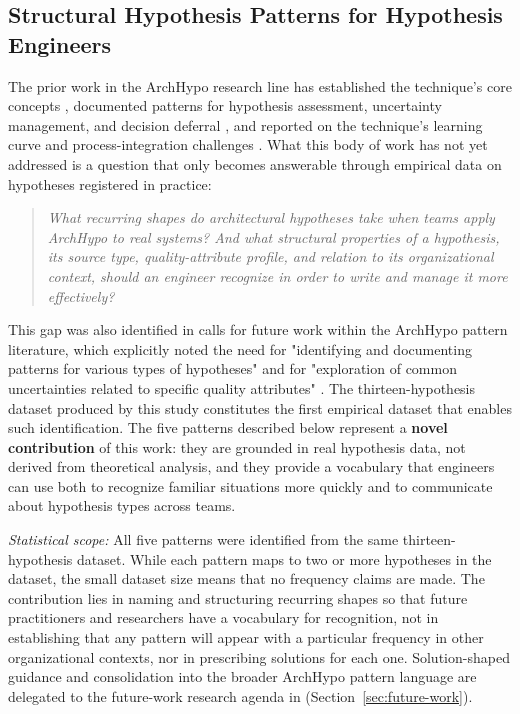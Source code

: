 \subsection{Structural Hypothesis Patterns for Hypothesis Engineers}
\label{sec:group-b-patterns}

The prior work in the ArchHypo research line has established the technique's
core concepts \citep{silva2025archhypo}, documented patterns for hypothesis
assessment, uncertainty management, and decision deferral
\citep{silva2024patterns, silva2023initialpatterns}, and reported on the
technique's learning curve and process-integration challenges
\citep{silva2024archhypo}. What this body of work has not yet addressed is
a question that only becomes answerable through empirical data on
hypotheses registered in practice:

\begin{quote}
\textit{What recurring shapes do architectural hypotheses take when teams apply
ArchHypo to real systems? And what structural properties of a hypothesis, its
source type, quality-attribute profile, and relation to its organizational
context, should an engineer recognize in order to write and manage it more
effectively?}
\end{quote}

This gap was also identified in calls for future work within the ArchHypo
pattern literature, which explicitly noted the need for "identifying and
documenting patterns for various types of hypotheses" and for "exploration of
common uncertainties related to specific quality attributes"
\citep{silva2024patterns}. The thirteen-hypothesis dataset produced by this
study constitutes the first empirical dataset that enables such identification.
The five patterns described below represent a \textbf{novel contribution}
of this work: they are grounded in real hypothesis data, not derived
from theoretical analysis, and they provide a vocabulary that 
engineers can use both to recognize familiar situations more quickly and to
communicate about hypothesis types across teams.

\emph{Statistical scope:} All five patterns were identified from the same
thirteen-hypothesis dataset. While each pattern maps to two or more
hypotheses in the dataset, the small dataset size means that no frequency claims are made. 
The contribution lies in naming and structuring recurring shapes so that future practitioners and researchers
have a vocabulary for recognition, not in establishing that any pattern
will appear with a particular frequency in other organizational contexts, nor
in prescribing solutions for each one. Solution-shaped guidance and
consolidation into the broader ArchHypo pattern language are delegated to the
future-work research agenda in (Section~\ref{sec:future-work}).

